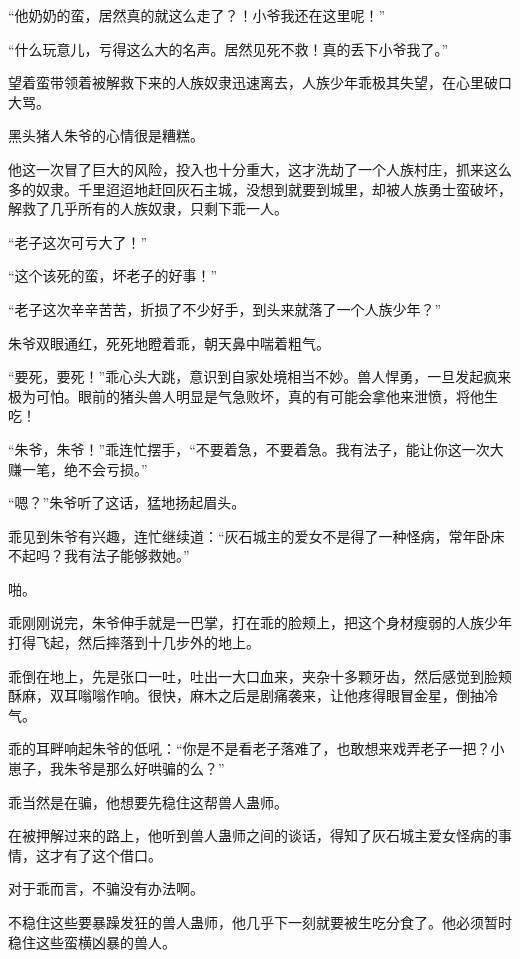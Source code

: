 
\begin{this_body}

“他奶奶的蛮，居然真的就这么走了？！小爷我还在这里呢！”

“什么玩意儿，亏得这么大的名声。居然见死不救！真的丢下小爷我了。”

望着蛮带领着被解救下来的人族奴隶迅速离去，人族少年乖极其失望，在心里破口大骂。

黑头猪人朱爷的心情很是糟糕。

他这一次冒了巨大的风险，投入也十分重大，这才洗劫了一个人族村庄，抓来这么多的奴隶。千里迢迢地赶回灰石主城，没想到就要到城里，却被人族勇士蛮破坏，解救了几乎所有的人族奴隶，只剩下乖一人。

“老子这次可亏大了！”

“这个该死的蛮，坏老子的好事！”

“老子这次辛辛苦苦，折损了不少好手，到头来就落了一个人族少年？”

朱爷双眼通红，死死地瞪着乖，朝天鼻中喘着粗气。

“要死，要死！”乖心头大跳，意识到自家处境相当不妙。兽人悍勇，一旦发起疯来极为可怕。眼前的猪头兽人明显是气急败坏，真的有可能会拿他来泄愤，将他生吃！

“朱爷，朱爷！”乖连忙摆手，“不要着急，不要着急。我有法子，能让你这一次大赚一笔，绝不会亏损。”

“嗯？”朱爷听了这话，猛地扬起眉头。

乖见到朱爷有兴趣，连忙继续道：“灰石城主的爱女不是得了一种怪病，常年卧床不起吗？我有法子能够救她。”

啪。

乖刚刚说完，朱爷伸手就是一巴掌，打在乖的脸颊上，把这个身材瘦弱的人族少年打得飞起，然后摔落到十几步外的地上。

乖倒在地上，先是张口一吐，吐出一大口血来，夹杂十多颗牙齿，然后感觉到脸颊酥麻，双耳嗡嗡作响。很快，麻木之后是剧痛袭来，让他疼得眼冒金星，倒抽冷气。

乖的耳畔响起朱爷的低吼：“你是不是看老子落难了，也敢想来戏弄老子一把？小崽子，我朱爷是那么好哄骗的么？”

乖当然是在骗，他想要先稳住这帮兽人蛊师。

在被押解过来的路上，他听到兽人蛊师之间的谈话，得知了灰石城主爱女怪病的事情，这才有了这个借口。

对于乖而言，不骗没有办法啊。

不稳住这些要暴躁发狂的兽人蛊师，他几乎下一刻就要被生吃分食了。他必须暂时稳住这些蛮横凶暴的兽人。


\end{this_body}

